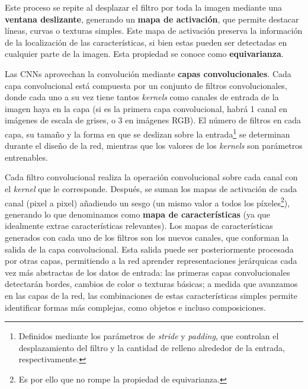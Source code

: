 Este proceso se repite al desplazar el filtro por toda la imagen mediante una \textbf{ventana deslizante}, 
generando un \textbf{mapa de activación}, que permite destacar líneas, curvas o texturas simples. Este mapa de
activación preserva la información de la localización de las características, si bien estas pueden ser 
detectadas en cualquier parte de la imagen. Esta propiedad se conoce como \textbf{equivarianza}. 

Las CNNs aprovechan la convolución mediante \textbf{capas convolucionales}. Cada capa convolucional está
compuesta por un conjunto de filtros convolucionales, donde cada uno a su vez tiene tantos \textit{kernels} 
como canales de entrada de la imagen haya en la capa (si es la primera capa convolucional, habrá 1 canal en 
imágenes de escala de grises, o 3 en imágenes RGB). El número de filtros en cada capa, su tamaño y la forma
en que se deslizan sobre la entrada\footnote{                                                                      %
    Definidos mediante los parámetros de \textit{stride} y \textit{padding}, que controlan el desplazamiento       %
    del filtro y la cantidad de relleno alrededor de la entrada, respectivamente.
}
se determinan durante el diseño de la red, mientras que los valores de los \textit{kernels} son parámetros 
entrenables.

Cada filtro convolucional realiza la operación convolucional sobre cada canal con el \textit{kernel} que le 
corresponde. Después, se suman los mapas de activación de cada canal (pixel a pixel) añadiendo un sesgo 
(un mismo valor a todos los píxeles\footnote{
    Es por ello que no rompe la propiedad de equivarianza.
}), 
generando lo que denominamos como \textbf{mapa de características} (ya que idealmente extrae características 
relevantes). Los mapas de características generados con cada uno de los filtros son los nuevos canales, que
conforman la salida de la capa convolucional. Esta salida puede ser posteriormente procesada por otras capas,
permitiendo a la red aprender representaciones jerárquicas cada vez más abstractas de los datos de entrada:
las primeras capas convolucionales detectarán bordes, cambios de color o texturas básicas; a medida que 
avanzamos en las capas de la red, las combinaciones de estas características simples permite identificar 
formas más complejas, como objetos e incluso composiciones.


